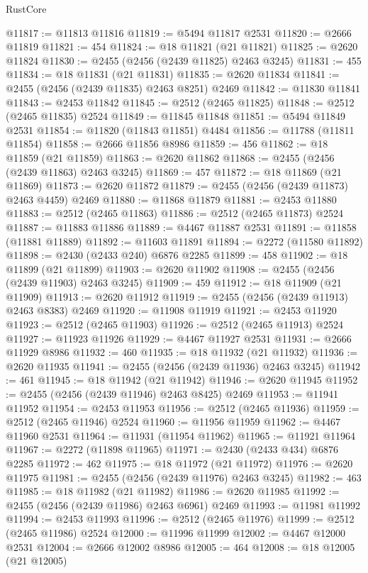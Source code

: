 \begin{lexlean}{RustCore}
\begin{coremodule}
@11817 := @11813 @11816
@11819 := @5494 @11817 @2531
@11820 := @2666 @11819
@11821 := 454
@11824 := @18 @11821 (@21 @11821)
@11825 := @2620 @11824
@11830 := @2455 (@2456 (@2439 @11825) @2463 @3245)
@11831 := 455
@11834 := @18 @11831 (@21 @11831)
@11835 := @2620 @11834
@11841 := @2455 (@2456 (@2439 @11835) @2463 @8251) @2469
@11842 := @11830 @11841
@11843 := @2453 @11842
@11845 := @2512 (@2465 @11825)
@11848 := @2512 (@2465 @11835) @2524
@11849 := @11845 @11848
@11851 := @5494 @11849 @2531
@11854 := @11820 (@11843 @11851) @4484
@11856 := @11788 (@11811 @11854)
@11858 := @2666 @11856 @8986
@11859 := 456
@11862 := @18 @11859 (@21 @11859)
@11863 := @2620 @11862
@11868 := @2455 (@2456 (@2439 @11863) @2463 @3245)
@11869 := 457
@11872 := @18 @11869 (@21 @11869)
@11873 := @2620 @11872
@11879 := @2455 (@2456 (@2439 @11873) @2463 @4459) @2469
@11880 := @11868 @11879
@11881 := @2453 @11880
@11883 := @2512 (@2465 @11863)
@11886 := @2512 (@2465 @11873) @2524
@11887 := @11883 @11886
@11889 := @4467 @11887 @2531
@11891 := @11858 (@11881 @11889)
@11892 := @11603 @11891
@11894 := @2272 (@11580 @11892)
@11898 := @2430 (@2433 @240) @6876 @2285
@11899 := 458
@11902 := @18 @11899 (@21 @11899)
@11903 := @2620 @11902
@11908 := @2455 (@2456 (@2439 @11903) @2463 @3245)
@11909 := 459
@11912 := @18 @11909 (@21 @11909)
@11913 := @2620 @11912
@11919 := @2455 (@2456 (@2439 @11913) @2463 @8383) @2469
@11920 := @11908 @11919
@11921 := @2453 @11920
@11923 := @2512 (@2465 @11903)
@11926 := @2512 (@2465 @11913) @2524
@11927 := @11923 @11926
@11929 := @4467 @11927 @2531
@11931 := @2666 @11929 @8986
@11932 := 460
@11935 := @18 @11932 (@21 @11932)
@11936 := @2620 @11935
@11941 := @2455 (@2456 (@2439 @11936) @2463 @3245)
@11942 := 461
@11945 := @18 @11942 (@21 @11942)
@11946 := @2620 @11945
@11952 := @2455 (@2456 (@2439 @11946) @2463 @8425) @2469
@11953 := @11941 @11952
@11954 := @2453 @11953
@11956 := @2512 (@2465 @11936)
@11959 := @2512 (@2465 @11946) @2524
@11960 := @11956 @11959
@11962 := @4467 @11960 @2531
@11964 := @11931 (@11954 @11962)
@11965 := @11921 @11964
@11967 := @2272 (@11898 @11965)
@11971 := @2430 (@2433 @434) @6876 @2285
@11972 := 462
@11975 := @18 @11972 (@21 @11972)
@11976 := @2620 @11975
@11981 := @2455 (@2456 (@2439 @11976) @2463 @3245)
@11982 := 463
@11985 := @18 @11982 (@21 @11982)
@11986 := @2620 @11985
@11992 := @2455 (@2456 (@2439 @11986) @2463 @6961) @2469
@11993 := @11981 @11992
@11994 := @2453 @11993
@11996 := @2512 (@2465 @11976)
@11999 := @2512 (@2465 @11986) @2524
@12000 := @11996 @11999
@12002 := @4467 @12000 @2531
@12004 := @2666 @12002 @8986
@12005 := 464
@12008 := @18 @12005 (@21 @12005)

\end{coremodule}
\end{lexlean}
